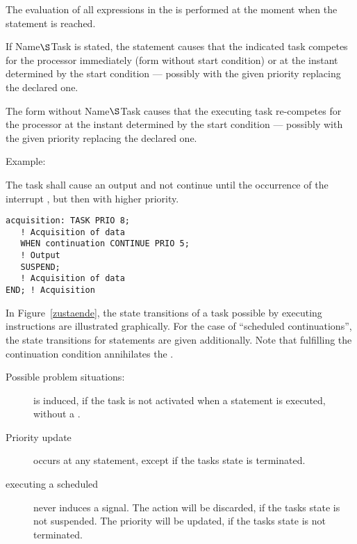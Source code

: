 The evaluation of all expressions in the  is performed 
at the moment when the  statement is reached. 


If Name$\S $Task is stated, the statement causes that the indicated task
competes for the processor immediately (form without start condition) or
at the instant determined by the start condition --- possibly with the
given priority replacing the declared one.

The form without Name$\S $Task causes that the executing task re-competes
for the processor at the instant determined by the start condition ---
possibly with the given priority replacing the declared one.

Example:

The task  shall cause an output and not continue until
the occurrence of the interrupt , but then with higher
priority.

\begin{lstlisting}
acquisition: TASK PRIO 8;
   ! Acquisition of data
   WHEN continuation CONTINUE PRIO 5;
   ! Output
   SUSPEND;
   ! Acquisition of data
END; ! Acquisition
\end{lstlisting}

In Figure~\ref{zustaende},
the state transitions of a task possible by executing 
instructions are illustrated graphically. For the case of
``scheduled continuations'', the state transitions for 
 statements are
given additionally.
Note that fulfilling the continuation condition annihilates the
.

Possible problem situations:
\begin{description}
\item[] is induced, if the task is not activated when 
a  statement is executed, without a .
\item[Priority update] occurs at any  statement,
 except if the tasks state is terminated.
\item[executing a scheduled ] never induces a signal. The action will
   be discarded, if the tasks state is not suspended. The priority will be 
   updated, if the tasks state is not terminated.
\end{description}


